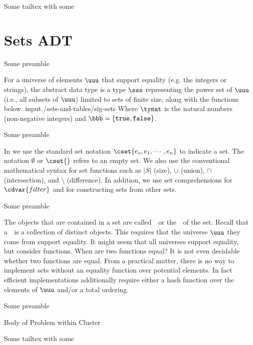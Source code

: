 Some tailtex with some \command

\section{Sets ADT}

Some preamble \somecommand
\begin{cluster}
\begin{datatype}[Sets]
\label{XXadt:sets} 
For a universe of elements $\uuu$ that support equality (e.g. the integers or strings), the 
 abstract data type is a type $\sss$ representing the power 
set of $\uuu$ (i.e., all subsets of $\uuu$) limited to sets of finite 
size, along with the functions below. 
{\normalsize
input{./sets-and-tables/sig-sets}
}
Where $\tynat$ is 
the natural numbers (non-negative integers) and $\bbb = \{\texttt{true},
\texttt{false}\}$.

\end{datatype}

Some preamble \somecommand
\begin{syntax}[Sets] 
\label{XXsyn:sets}
In \pml{}  we use the standard set notation $\cset{e_o,e_1,\cdots,e_n}$ to
  indicate a set.  The notation $\emptyset$ or $\cset{}$ refers to an
  empty set. We also use the conventional mathematical syntax for set
  functions such as $|S|$ (size), $\cup$ (union), $\cap$
  (intersection), and $\setminus$ (difference).  In addition, we use
  set comprehensions for $\cdvar{filter}$ and for constructing sets from
  other sets.
\end{syntax}

Some preamble \somecommand
\begin{gram}
  The objects that are contained in a set are called~~or the~~of the set.  Recall that a~~is a collection of distinct objects.  This requires that
  the universe $\uuu$ they come from support equality.  It might seem that
  all universes support equality, but consider functions.  When are
  two functions equal?   It is not even decidable whether two
  functions are equal.   From a practical matter, there is no way to
  implement sets without an equality function over potential
  elements.   In fact efficient implementations additionally require
  either a hash function over the elements of $\uuu$ and/or a total ordering.
\end{gram}

Some preamble \somecommand
\begin{problem}
Body of Problem within Cluster
\end{problem}

Some tailtex with some \command

\end{cluster}

